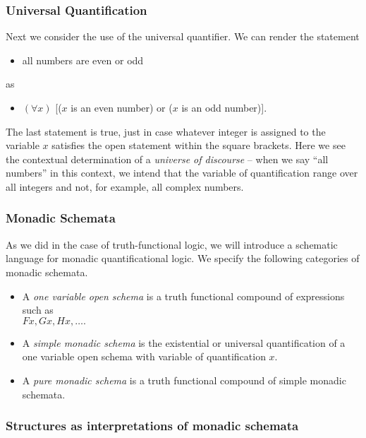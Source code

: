 \subsubsection{Universal Quantification}

Next we consider the use of the universal quantifier. We can render the statement
\begin{itemize}
\item all numbers are even or odd
\end{itemize}
as
\begin{itemize}
\item $(\forall x)$ [($x$ is an even number) or ($x$ is an odd number)].
\end{itemize}
The last statement is true, just in case whatever integer is assigned to the variable $x$ satisfies the open statement within the square brackets. Here we see the contextual determination of a \emph{universe of discourse} -- when we say ``all numbers'' in this context, we intend that the variable of quantification range over all integers and not, for example, all complex numbers.
\subsubsection{Monadic Schemata}

As we did in the case of truth-functional logic, we will introduce a schematic language for monadic quantificational logic. We specify the following categories of monadic schemata.
\begin{itemize}
\item 
A {\em one variable open schema} is a truth functional compound of expressions
such as \\
$Fx , Gx , Hx , \ldots .$
\item
A {\em simple monadic schema} is the existential or universal quantification of
a one variable open schema with variable of quantification $x.$
\item
A {\em pure monadic schema} is a truth functional compound of simple monadic
schemata. 
\end{itemize}
\subsubsection{Structures as interpretations of monadic schemata}

